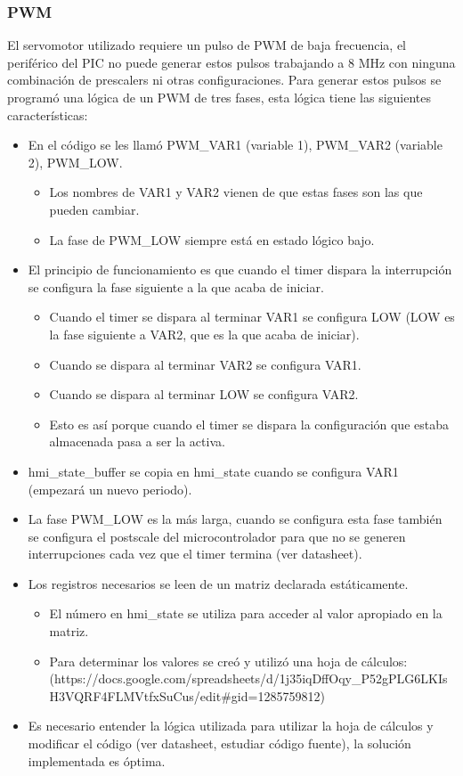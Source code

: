   \subsubsection{PWM}
El servomotor utilizado requiere un pulso de PWM de baja frecuencia, el periférico del PIC no puede generar estos pulsos trabajando a 8 MHz con ninguna combinación de prescalers ni otras configuraciones. Para generar estos pulsos se programó una lógica de un PWM de tres fases, esta lógica tiene las siguientes características:
\begin{itemize}
\item En el código se les llamó PWM\_VAR1 (variable 1), PWM\_VAR2 (variable 2), PWM\_LOW.
 \begin{itemize}
  \item Los nombres de VAR1 y VAR2 vienen de que estas fases son las que pueden cambiar.
  \item La fase de PWM\_LOW siempre está en estado lógico bajo.
 \end{itemize}
\item El principio de funcionamiento es que cuando el timer dispara la interrupción se configura la fase siguiente a la que acaba de iniciar.
 \begin{itemize}
  \item Cuando el timer se dispara al terminar VAR1 se configura LOW (LOW es la fase siguiente a VAR2, que es la que acaba de iniciar).
  \item Cuando se dispara al terminar VAR2 se configura VAR1.
  \item Cuando se dispara al terminar LOW se configura VAR2.
  \item Esto es así porque cuando el timer se dispara la configuración que estaba almacenada pasa a ser la activa.
 \end{itemize}
\item hmi\_state\_buffer se copia en hmi\_state cuando se configura VAR1 (empezará un nuevo periodo).
\item La fase PWM\_LOW es la más larga, cuando se configura esta fase también se configura el postscale del microcontrolador para que no se generen interrupciones cada vez que el timer termina (ver datasheet).
\item Los registros necesarios se leen de un matriz declarada estáticamente.
 \begin{itemize}
  \item El número en hmi\_state se utiliza para acceder al valor apropiado en la matriz.
  \item Para determinar los valores se creó y utilizó una hoja de cálculos:
(https://docs.google.com/spreadsheets/d/1j35iqDffOqy\_P52gPLG6LKIsH3VQRF4FLMVtfxSuCus/edit\#gid=1285759812)
 \end{itemize}
\item Es necesario entender la lógica utilizada para utilizar la hoja de cálculos y modificar el código (ver datasheet, estudiar código fuente), la solución implementada es óptima.
\end{itemize}

